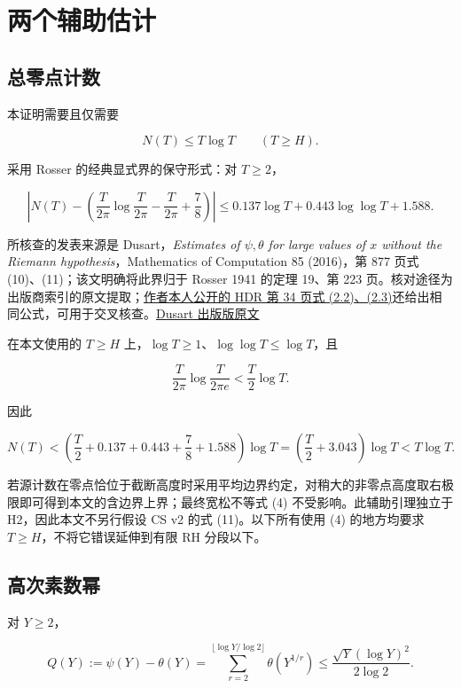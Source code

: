 \documentclass[UTF8,zihao=-4,fontset=fandol]{ctexart}
\begin{document}
\section{两个辅助估计}

\subsection{总零点计数}

本证明需要且仅需要

\[
N(T)\le T\log T\qquad(T\ge H). \tag{4}
\]

采用 Rosser 的经典显式界的保守形式：对 \(T\ge2\)，

\[
\left|N(T)-\left(\frac{T}{2\pi}\log\frac{T}{2\pi}
-\frac{T}{2\pi}+\frac78\right)\right|
\le0.137\log T+0.443\log\log T+1.588. \tag{4a}
\]

所核查的发表来源是 Dusart，\emph{Estimates of \(\psi,\theta\) for large values of \(x\) without the Riemann hypothesis}，Mathematics of Computation 85 (2016)，第 877 页式 (10)、(11)；该文明确将此界归于 Rosser 1941 的定理 19、第 223 页。核对途径为出版商索引的原文提取；\href{https://www.unilim.fr/pages_perso/pierre.dusart/Documents/HDR_Dusart.pdf\#page=44}{作者本人公开的 HDR 第 34 页式 (2.2)、(2.3)}还给出相同公式，可用于交叉核查。\href{https://www.ams.org/mcom/2016-85-298/S0025-5718-2015-03005-1/S0025-5718-2015-03005-1.pdf}{Dusart 出版版原文}~\cite{Dusart}

在本文使用的 \(T\ge H\) 上，\(\log T\ge1\)、\(\log\log T\le\log T\)，且

\[
\frac{T}{2\pi}\log\frac{T}{2\pi e}<\frac T2\log T.
\]

因此

\[
N(T)<\left(\frac T2+0.137+0.443+\frac78+1.588\right)\log T
=\left(\frac T2+3.043\right)\log T<T\log T.
\]

若源计数在零点恰位于截断高度时采用平均边界约定，对稍大的非零点高度取右极限即可得到本文的含边界上界；最终宽松不等式 (4) 不受影响。此辅助引理独立于 H2，因此本文不另行假设 CS v2 的式 (11)。以下所有使用 (4) 的地方均要求 \(T\ge H\)，不将它错误延伸到有限 RH 分段以下。

\subsection{高次素数幂}

对 \(Y\ge2\)，

\[
Q(Y):=\psi(Y)-\theta(Y)
=\sum_{r=2}^{\lfloor\log Y/\log2\rfloor}\theta(Y^{1/r})
\le\frac{\sqrt Y(\log Y)^2}{2\log2}. \tag{5}
\]
\end{document}
